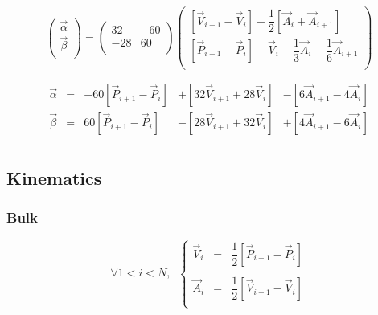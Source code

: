 \documentclass[aps,12pt]{revtex4}
\begin{document}
\begin{equation}
\begin{pmatrix}
\vec{\alpha}\\
\vec{\beta}\\
\end{pmatrix}
=
\begin{pmatrix}
32  & -60 \\
-28 & 60\\
\end{pmatrix}
\begin{pmatrix}
\left[\vec{V}_{i+1}-\vec{V}_{i}\right] - \dfrac{1}{2}\left[\vec{A}_i + \vec{A}_{i+1}\right]\\
\left[\vec{P}_{i+1}-\vec{P}_{i}\right] - \vec{V}_i - \dfrac{1}{3} \vec{A}_i - \dfrac{1}{6} \vec{A}_{i+1}\\
\end{pmatrix}
\end{equation}

\begin{equation}
\begin{array}{rcrrr}
	\vec{\alpha} & = & -60\left[\vec{P}_{i+1}-\vec{P}_i\right] & + \left[32\vec{V}_{i+1} + 28 \vec{V}_i\right] &  - \left[6\vec{A}_{i+1} -4\vec{A}_{i}\right]\\
	\vec{\beta}  & = & 60\left[\vec{P}_{i+1}-\vec{P}_i\right]   & - \left[28\vec{V}_{i+1} + 32 \vec{V}_i\right] & + \left[4\vec{A}_{i+1}-6\vec{A}_{i}\right]\\
\end{array}
\end{equation}

\subsection{Kinematics}

\subsubsection{Bulk}

\begin{equation}
\forall 1 < i < N, \;\;
\left\lbrace
\begin{array}{rcl}
	\vec{V}_i & = & \dfrac{1}{2} \left[ \vec{P}_{i+1} - \vec{P}_i\right]\\
	\\
	\vec{A}_i & = & \dfrac{1}{2} \left[ \vec{V}_{i+1} - \vec{V}_i\right]\\
\end{array}
\right.
\end{equation}
\end{document}
